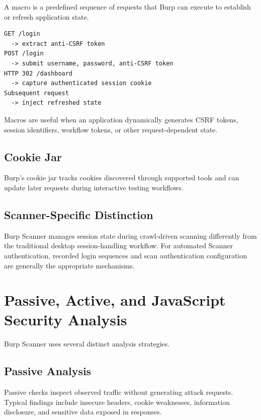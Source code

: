 \documentclass[11pt]{article}
\begin{document}
A macro is a predefined sequence of requests that Burp can execute to establish or refresh application state.

\begin{lstlisting}[style=guidecode]
GET /login
  -> extract anti-CSRF token
POST /login
  -> submit username, password, anti-CSRF token
HTTP 302 /dashboard
  -> capture authenticated session cookie
Subsequent request
  -> inject refreshed state
\end{lstlisting}

Macros are useful when an application dynamically generates CSRF tokens, session identifiers, workflow tokens, or other request-dependent state.

\subsection{Cookie Jar}

Burp's cookie jar tracks cookies discovered through supported tools and can update later requests during interactive testing workflows.

\subsection{Scanner-Specific Distinction}

\begin{warningbox}
Burp Scanner manages session state during crawl-driven scanning differently from the traditional desktop session-handling workflow. For automated Scanner authentication, recorded login sequences and scan authentication configuration are generally the appropriate mechanisms.
\end{warningbox}

\section{Passive, Active, and JavaScript Security Analysis}

Burp Scanner uses several distinct analysis strategies.

\subsection{Passive Analysis}

Passive checks inspect observed traffic without generating attack requests. Typical findings include insecure headers, cookie weaknesses, information disclosure, and sensitive data exposed in responses.
\end{document}
